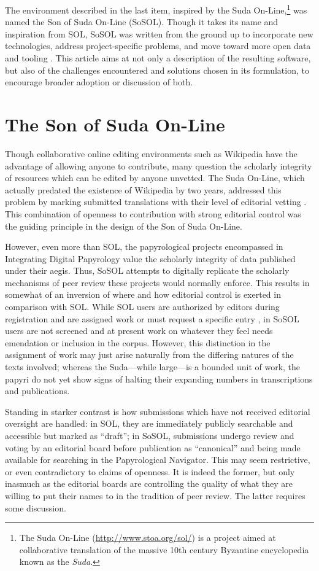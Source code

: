 \documentclass[]{article}
\begin{document}
The environment described in the last item, inspired by the Suda On-Line,\footnote{The Suda On-Line (\url{http://www.stoa.org/sol/}) is a project aimed at collaborative translation of the massive 10th century Byzantine encyclopedia known as the \emph{Suda}.} was named the Son of Suda On-Line (SoSOL). Though it takes its name and inspiration from SOL, SoSOL was written from the ground up to incorporate new technologies, address project-specific problems, and move toward more open data and tooling \citep{background, sosin}. This article aims at not only a description of the resulting software, but also of the challenges encountered and solutions chosen in its formulation, to encourage broader adoption or discussion of both.

\section*{The Son of Suda On-Line}

Though collaborative online editing environments such as Wikipedia have the advantage of allowing anyone to contribute, many question the scholarly integrity of resources which can be edited by anyone unvetted. The Suda On-Line, which actually predated the existence of Wikipedia by two years, addressed this problem by marking submitted translations with their level of editorial vetting \citep{finkel}. This combination of openness to contribution with strong editorial control was the guiding principle in the design of the Son of Suda On-Line.

However, even more than SOL, the papyrological projects encompassed in Integrating Digital Papyrology value the scholarly integrity of data published under their aegis. Thus, SoSOL attempts to digitally replicate the scholarly mechanisms of peer review these projects would normally enforce. This results in somewhat of an inversion of where and how editorial control is exerted in comparison with SOL. While SOL users are authorized by editors during registration and are assigned work or must request a specific entry \citep{mahoney}, in SoSOL users are not screened and at present work on whatever they feel needs emendation or inclusion in the corpus. However, this distinction in the assignment of work may just arise naturally from the differing natures of the texts involved; whereas the Suda—while large—is a bounded unit of work, the papyri do not yet show signs of halting their expanding numbers in transcriptions and publications.

Standing in starker contrast is how submissions which have not received editorial oversight are handled: in SOL, they are immediately publicly searchable and accessible but marked as “draft”; in SoSOL, submissions undergo review and voting by an editorial board before publication as “canonical” and being made available for searching in the Papyrological Navigator. This may seem restrictive, or even contradictory to claims of openness. It is indeed the former, but only inasmuch as the editorial boards are controlling the quality of what they are willing to put their names to in the tradition of peer review. The latter requires some discussion.
\end{document}
